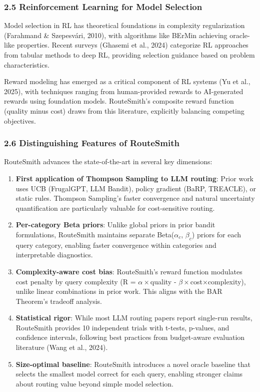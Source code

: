 \documentclass[
  11pt,
]{article}
\begin{document}
\hypertarget{reinforcement-learning-for-model-selection}{%
\subsubsection{2.5 Reinforcement Learning for Model
Selection}\label{reinforcement-learning-for-model-selection}}

Model selection in RL has theoretical foundations in complexity
regularization (Farahmand \& Szepesvári, 2010), with algorithms like
BErMin achieving oracle-like properties. Recent surveys (Ghasemi et al.,
2024) categorize RL approaches from tabular methods to deep RL,
providing selection guidance based on problem characteristics.

Reward modeling has emerged as a critical component of RL systems (Yu et
al., 2025), with techniques ranging from human-provided rewards to
AI-generated rewards using foundation models. RouteSmith's composite
reward function (quality minus cost) draws from this literature,
explicitly balancing competing objectives.

\hypertarget{distinguishing-features-of-routesmith}{%
\subsubsection{2.6 Distinguishing Features of
RouteSmith}\label{distinguishing-features-of-routesmith}}

RouteSmith advances the state-of-the-art in several key dimensions:

\begin{enumerate}
\def\labelenumi{\arabic{enumi}.}
\item
  \textbf{First application of Thompson Sampling to LLM routing}: Prior
  work uses UCB (FrugalGPT, LLM Bandit), policy gradient (BaRP,
  TREACLE), or static rules. Thompson Sampling's faster convergence and
  natural uncertainty quantification are particularly valuable for
  cost-sensitive routing.
\item
  \textbf{Per-category Beta priors}: Unlike global priors in prior
  bandit formulations, RouteSmith maintains separate Beta(\(\alpha_c\),
  \(\beta_c\)) priors for each query category, enabling faster
  convergence within categories and interpretable diagnostics.
\item
  \textbf{Complexity-aware cost bias}: RouteSmith's reward function
  modulates cost penalty by query complexity (R =
  \(\alpha\times\)quality - \(\beta\times\)cost×complexity), unlike
  linear combinations in prior work. This aligns with the BAR Theorem's
  tradeoff analysis.
\item
  \textbf{Statistical rigor}: While most LLM routing papers report
  single-run results, RouteSmith provides 10 independent trials with
  t-tests, p-values, and confidence intervals, following best practices
  from budget-aware evaluation literature (Wang et al., 2024).
\item
  \textbf{Size-optimal baseline}: RouteSmith introduces a novel oracle
  baseline that selects the smallest model correct for each query,
  enabling stronger claims about routing value beyond simple model
  selection.
\end{enumerate}
\end{document}

